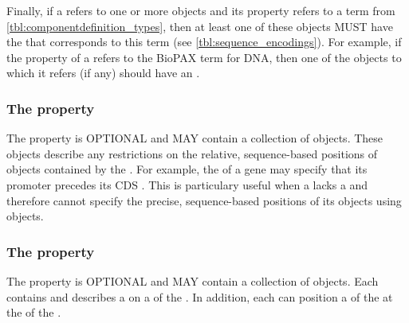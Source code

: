 Finally, if a  refers to one or more  objects and its  property refers to a term from \ref{tbl:componentdefinition_types}, then at least one of these objects MUST have the  that corresponds to this term (see \ref{tbl:sequence_encodings}). For example, if the  property of a  refers to the BioPAX term for DNA, then one of the  objects to which it refers (if any) should have an  .

\subsubsection*{The  property}
\label{sec:sequenceConstraints}

The  property is OPTIONAL and MAY contain a collection of  objects. These objects describe any restrictions on the relative, sequence-based positions of  objects contained by the . For example, the  of a gene may specify that its promoter  precedes its CDS . This is particulary useful when a  lacks a  and therefore cannot specify the precise, sequence-based positions of its  objects using  objects.

\subsubsection*{The  property}
\label{sec:sequenceAnnotations}

The  property is OPTIONAL and MAY contain a collection of  objects. Each  contains and describes a  on a  of the . In addition, each  can  position a  of the  at the  of the .

